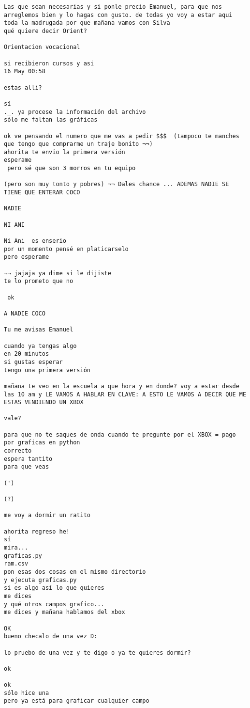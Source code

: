 \begin{verbatim}
Las que sean necesarias y si ponle precio Emanuel, para que nos arreglemos bien y lo hagas con gusto. de todas yo voy a estar aqui toda la madrugada por que mañana vamos con Silva
qué quiere decir Orient?

Orientacion vocacional

si recibieron cursos y asi
16 May 00:58

estas alli?

sí
._. ya procese la información del archivo
sólo me faltan las gráficas

ok ve pensando el numero que me vas a pedir $$$  (tampoco te manches que tengo que comprarme un traje bonito ¬¬)
ahorita te envio la primera versión
esperame
 pero sé que son 3 morros en tu equipo

(pero son muy tonto y pobres) ¬¬ Dales chance ... ADEMAS NADIE SE TIENE QUE ENTERAR COCO 

NADIE

NI ANI

Ni Ani  es enserio
por un momento pensé en platicarselo
pero esperame

¬¬ jajaja ya dime si le dijiste
te lo prometo que no

 ok

A NADIE COCO

Tu me avisas Emanuel

cuando ya tengas algo
en 20 minutos
si gustas esperar
tengo una primera versión

mañana te veo en la escuela a que hora y en donde? voy a estar desde las 10 am y LE VAMOS A HABLAR EN CLAVE: A ESTO LE VAMOS A DECIR QUE ME ESTAS VENDIENDO UN XBOX

vale?

para que no te saques de onda cuando te pregunte por el XBOX = pago por graficas en python
correcto
espera tantito
para que veas

(')

(?)

me voy a dormir un ratito

ahorita regreso he!
sí
mira...
graficas.py
ram.csv
pon esas dos cosas en el mismo directorio
y ejecuta graficas.py
si es algo así lo que quieres
me dices
y qué otros campos grafico...
me dices y mañana hablamos del xbox 

OK
bueno checalo de una vez D:

lo pruebo de una vez y te digo o ya te quieres dormir?

ok

ok
sólo hice una
pero ya está para graficar cualquier campo


\end{verbatim}
